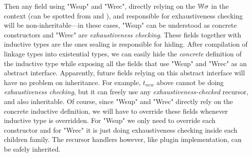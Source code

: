 Then any field using "Wsup" and "Wrec", directly relying on the
${\mathbb{W}}\sigma$ in the context (can be spotted from  and
), and responsible for exhaustiveness checking will be non-inheritable---in these cases, "Wsup"
can be understood as concrete constructors and "Wrec" are
\textit{exhaustiveness checking}. These fields together with inductive
types are the ones sealing is responsible for hiding.
After compilation
of linkage types into existential types, we can easily hide the
\textit{concrete} definition of the inductive type while exposing all
the fields that use "Wsup" and "Wrec" as an abstract interface.
Apparently, future fields relying on this abstract interface will have no
problem on inheritance. 
For example, $t_{new}$ above cannot be doing \textit{exhaustiveness
checking}, but it can freely use any \textit{exhaustiveness-checked}
recursor, and also inheritable.
Of course, since "Wsup" and "Wrec" directly rely on the concrete inductive definition, we will have to override these fields whenever inductive type is overridden. For "Wsup" we only need to override each constructor and for "Wrec" it is just doing exhaustiveness checking inside each children family. The recursor handlers however, like plugin implementation, can be safely inherited.

